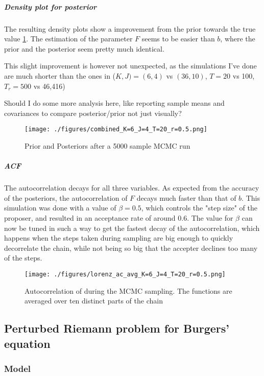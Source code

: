 \documentclass[11pt]{article}
\begin{document}
\subparagraph{Density plot for posterior}
\label{sec:orgec24b2c}

The resulting density plots show a improvement from the prior towards the true value \ref{fig:lorenz_densities}.
The estimation of the parameter \(F\) seems to be easier than \(b\), where the prior and the
posterior seem pretty much identical.

This slight improvement is however not unexpected, as the simulations I've done are much shorter than
the ones in \cite{schneider_earth_2017} (\(K, J) = (6,4)\) vs \((36, 10)\), \(T = 20\) vs 100, \(T_r = 500\) vs 46,416)

Should I do some more analysis here, like reporting sample means and covariances to compare
posterior/prior not just visually?

\begin{figure}[htbp]
\centering
\texttt{[image: ./figures/combined\_K=6\_J=4\_T=20\_r=0.5.png]}
\caption{\label{fig:lorenz_densities}
Prior and Posteriors after a 5000 sample MCMC run}
\end{figure}

\subparagraph{ACF}
\label{sec:orgb82ef46}

The autocorrelation decays for all three variables. As expected from the accuracy of the posteriors,
the autocorrelation of \(F\) decays much faster than that of \(b\). This simulation was done with a
value of \(\beta=0.5\), which controls the "step size" of the proposer, and resulted in an acceptance
rate of around \(0.6\). The value for \(\beta\) can now be tuned in such a way to get the fastest decay
of the autocorrelation, which happens when the steps taken during sampling are big enough to
quickly decorrelate the chain, while not being so big that the accepter declines too many of the steps.

\begin{figure}[htbp]
\centering
\texttt{[image: ./figures/lorenz\_ac\_avg\_K=6\_J=4\_T=20\_r=0.5.png]}
\caption{\label{fig:lorenz_acF}
Autocorrelation of during the MCMC sampling. The functions are averaged over ten distinct parts of the chain}
\end{figure}
\subsection{Perturbed Riemann problem for Burgers' equation}
\label{sec:org6c7e318}
\subsubsection{Model}
\label{sec:org495abb2}
\end{document}
